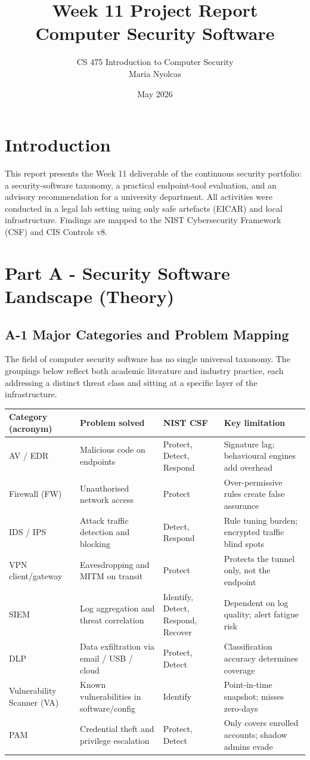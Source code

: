 \documentclass[10pt,a4paper]{article}
\title{Week 11 Project Report \\ Computer Security Software}
\author{CS 475 Introduction to Computer Security \\ Maria Nyolcas}
\date{May 2026}
\begin{document}
\maketitle

\section*{Introduction}
This report presents the Week 11 deliverable of the continuous security portfolio: a security-software taxonomy, a practical endpoint-tool evaluation, and an advisory recommendation for a university department. All activities were conducted in a legal lab setting using only safe artefacts (EICAR) and local infrastructure. Findings are mapped to the NIST Cybersecurity Framework (CSF) and CIS Controls v8.

\section*{Part A - Security Software Landscape (Theory)}

\subsection*{A-1 Major Categories and Problem Mapping}
The field of computer security software has no single universal taxonomy. The groupings below reflect both academic literature and industry practice, each addressing a distinct threat class and sitting at a specific layer of the infrastructure.

\begin{longtable}{p{3.2cm}p{3.0cm}p{2.2cm}p{5.8cm}}
\toprule
Category (acronym) & Problem solved & NIST CSF & Key limitation \\
\midrule
AV / EDR & Malicious code on endpoints & Protect, Detect, Respond & Signature lag; behavioural engines add overhead \\
Firewall (FW) & Unauthorised network access & Protect & Over-permissive rules create false assurance \\
IDS / IPS & Attack traffic detection and blocking & Detect, Respond & Rule tuning burden; encrypted traffic blind spots \\
VPN client/gateway & Eavesdropping and MITM on transit & Protect & Protects the tunnel only, not the endpoint \\
SIEM & Log aggregation and threat correlation & Identify, Detect, Respond, Recover & Dependent on log quality; alert fatigue risk \\
DLP & Data exfiltration via email / USB / cloud & Protect, Detect & Classification accuracy determines coverage \\
Vulnerability Scanner (VA) & Known vulnerabilities in software/config & Identify & Point-in-time snapshot; misses zero-days \\
PAM & Credential theft and privilege escalation & Protect, Detect & Only covers enrolled accounts; shadow admins evade \\
\bottomrule
\end{longtable}
\end{document}

